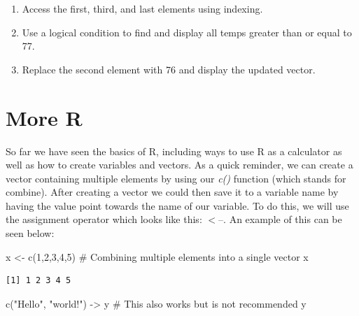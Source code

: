 \documentclass[
  letterpaper,
  DIV=11,
  numbers=noendperiod]{scrreprt}
\newenvironment{Shaded}{\begin{snugshade}}{\end{snugshade}}
\newcommand{\CommentTok}[1]{\textcolor[rgb]{0.37,0.37,0.37}{#1}}
\newcommand{\DecValTok}[1]{\textcolor[rgb]{0.68,0.00,0.00}{#1}}
\newcommand{\FunctionTok}[1]{\textcolor[rgb]{0.28,0.35,0.67}{#1}}
\newcommand{\NormalTok}[1]{\textcolor[rgb]{0.00,0.23,0.31}{#1}}
\newcommand{\OtherTok}[1]{\textcolor[rgb]{0.00,0.23,0.31}{#1}}
\newcommand{\StringTok}[1]{\textcolor[rgb]{0.13,0.47,0.30}{#1}}
\providecommand{\tightlist}{%
  \setlength{\itemsep}{0pt}\setlength{\parskip}{0pt}}
\begin{document}
\begin{itemize}
  \begin{enumerate}
  \def\labelenumi{\alph{enumi})}
  \tightlist
  \item
    Access the first, third, and last elements using indexing.\\
  \item
    Use a logical condition to find and display all temps greater than
    or equal to 77.\\
  \item
    Replace the second element with 76 and display the updated vector.
  \end{enumerate}
\end{itemize}


\chapter{More R}\label{more-r}

So far we have seen the basics of R, including ways to use R as a
calculator as well as how to create variables and vectors. As a quick
reminder, we can create a vector containing multiple elements by using
our \emph{c()} function (which stands for combine). After creating a
vector we could then save it to a variable name by having the value
point towards the name of our variable. To do this, we will use the
assignment operator which looks like this: \(<\)--. An example of this
can be seen below:

\begin{Shaded}
\begin{Highlighting}[]
\NormalTok{x }\OtherTok{\textless{}{-}} \FunctionTok{c}\NormalTok{(}\DecValTok{1}\NormalTok{,}\DecValTok{2}\NormalTok{,}\DecValTok{3}\NormalTok{,}\DecValTok{4}\NormalTok{,}\DecValTok{5}\NormalTok{) }\CommentTok{\# Combining multiple elements into a single vector }
\NormalTok{x}
\end{Highlighting}
\end{Shaded}

\begin{verbatim}
[1] 1 2 3 4 5
\end{verbatim}

\begin{Shaded}
\begin{Highlighting}[]
\FunctionTok{c}\NormalTok{(}\StringTok{"Hello"}\NormalTok{, }\StringTok{"world!"}\NormalTok{) }\OtherTok{{-}\textgreater{}}\NormalTok{ y }\CommentTok{\# This also works but is not recommended}
\NormalTok{y}
\end{Highlighting}
\end{Shaded}
\end{document}
